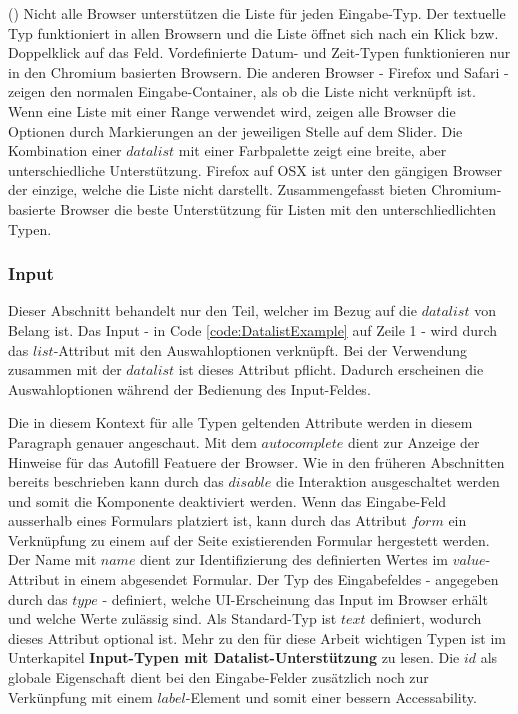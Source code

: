 (\cite{datalistMdn}) Nicht alle Browser unterstützen die Liste für jeden Eingabe-Typ.
Der textuelle Typ funktioniert in allen Browsern und die Liste öffnet sich nach ein Klick bzw. Doppelklick auf das Feld.
Vordefinierte Datum- und Zeit-Typen funktionieren nur in den Chromium basierten Browsern. 
Die anderen Browser - Firefox und Safari - zeigen den normalen Eingabe-Container, als ob die Liste nicht verknüpft ist.
Wenn eine Liste mit einer Range verwendet wird, zeigen alle Browser die Optionen durch Markierungen an der jeweiligen Stelle auf dem Slider.
Die Kombination einer $datalist$ mit einer Farbpalette zeigt eine breite, aber unterschiedliche Unterstützung. 
Firefox auf OSX ist unter den gängigen Browser der einzige, welche die Liste nicht darstellt.
Zusammengefasst bieten Chromium-basierte Browser die beste Unterstützung für Listen mit den unterschliedlichten Typen.


\subsubsection{Input}

Dieser Abschnitt behandelt nur den Teil, welcher im Bezug auf die $datalist$ von Belang ist.
Das Input - in Code \ref{code:DatalistExample} auf Zeile 1 - wird durch das $list$-Attribut mit den Auswahloptionen verknüpft.
Bei der Verwendung zusammen mit der $datalist$ ist dieses Attribut pflicht.
Dadurch erscheinen die Auswahloptionen während der Bedienung des Input-Feldes. 

Die in diesem Kontext für alle Typen geltenden Attribute werden in diesem Paragraph genauer angeschaut.
Mit dem $autocomplete$ dient zur Anzeige der Hinweise für das Autofill Featuere der Browser.
Wie in den früheren Abschnitten bereits beschrieben kann durch das $disable$ die Interaktion ausgeschaltet werden und somit die Komponente deaktiviert werden.
Wenn das Eingabe-Feld ausserhalb eines Formulars platziert ist, kann durch das Attribut $form$ ein Verknüpfung zu einem auf der Seite existierenden Formular hergestett werden.
Der Name mit $name$ dient zur Identifizierung des definierten Wertes im $value$-Attribut in einem abgesendet Formular.
Der Typ des Eingabefeldes - angegeben durch das $type$ - definiert, welche UI-Erscheinung das Input im Browser erhält und welche Werte zulässig sind.
Als Standard-Typ ist $text$ definiert, wodurch dieses Attribut optional ist.
Mehr zu den für diese Arbeit wichtigen Typen ist im Unterkapitel \textbf{Input-Typen mit Datalist-Unterstützung} zu lesen.
Die $id$ als globale Eigenschaft dient bei den Eingabe-Felder zusätzlich noch zur Verkünpfung mit einem $label$-Element und somit einer bessern Accessability.

